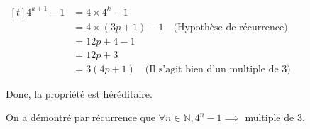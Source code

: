 \documentclass[12pt, a4paper]{article}
\begin{document}
    {\begin{center}
    $\begin{aligned}[t]
        4^{k+1}-1&=4\times 4^k-1 &\\
        &= 4\times\left(3p+1\right)-1 \quad \text{(Hypothèse de récurrence)} &\\
        &=12p+4-1 &\\
        &=12p+3 &\\
        &=3\left(4p+1\right) \quad \text{(Il s'agit bien d'un multiple de 3)}
    \end{aligned}$
    \end{center}} \vspace{\baselineskip}
    {\indent\parbox[t]{\dimexpr\linewidth-\parindent}{
    Donc, la propriété est héréditaire.

    On a démontré par récurrence que $\forall n\in\mathbb{N},4^n-1\implies$ multiple de 3.
    }} 
\end{document}
